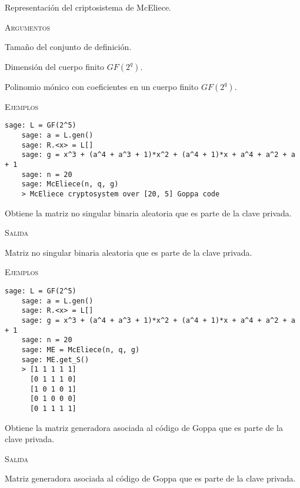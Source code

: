 \begin{description}[leftmargin=1em, font=\normalfont\ttfamily, style=nextline]
  \item[class McEliece(self, n, q, g)]

  Representación del criptosistema de McEliece.

  \textsc{Argumentos}
  \begin{description}[font=\normalfont\ttfamily]
  \item[n] Tamaño del conjunto de definición.
  \item[q] Dimensión del cuerpo finito $GF(2^q)$.
  \item[g] Polinomio mónico con coeficientes en un cuerpo finito $GF(2^q)$.
  \end{description}

  \textsc{Ejemplos}
  \begin{lstlisting}[gobble=4]
    sage: L = GF(2^5)
    sage: a = L.gen()
    sage: R.<x> = L[]
    sage: g = x^3 + (a^4 + a^3 + 1)*x^2 + (a^4 + 1)*x + a^4 + a^2 + a + 1
    sage: n = 20
    sage: McEliece(n, q, g)
    > McEliece cryptosystem over [20, 5] Goppa code
  \end{lstlisting}

  \begin{description}[font=\ttfamily, style=nextline]
  \item[get\_S(self)] Obtiene la matriz no singular binaria aleatoria que es parte de la clave privada.
  
  \textsc{Salida}
  \begin{description}[font=\normalfont\ttfamily]
    \item[] Matriz no singular binaria aleatoria que es parte de la clave privada.
  \end{description}

  \textsc{Ejemplos}
  \begin{lstlisting}[gobble=4]
    sage: L = GF(2^5)
    sage: a = L.gen()
    sage: R.<x> = L[]
    sage: g = x^3 + (a^4 + a^3 + 1)*x^2 + (a^4 + 1)*x + a^4 + a^2 + a + 1
    sage: n = 20
    sage: ME = McEliece(n, q, g)
    sage: ME.get_S()
    > [1 1 1 1 1]
      [0 1 1 1 0]
      [1 0 1 0 1]
      [0 1 0 0 0]
      [0 1 1 1 1]
  \end{lstlisting}

  \item[get\_G(self)] Obtiene la matriz generadora asociada al código de Goppa que es parte de la clave privada.
  
  \textsc{Salida}
  \begin{description}[font=\normalfont\ttfamily]
    \item[] Matriz generadora asociada al código de Goppa que es parte de la clave privada.
  \end{description}


\end{description}
\end{description}
